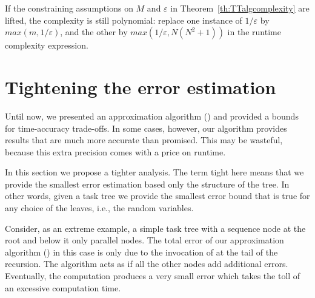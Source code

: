 \documentclass{article}
\begin{document}
If the constraining assumptions on $M$ and $\varepsilon$ in Theorem~\ref{th:TTalgcomplexity} are lifted, the complexity is still polynomial:
replace one instance of $1/\varepsilon$ by $max(m,1/\varepsilon)$, and the other by $max(1/\varepsilon,N (N^2+1))$
in the runtime complexity expression.

\section{Tightening the error estimation}\label{Chap:Bound}

Until now, we presented an approximation algorithm (\Network) and provided a bounds for time-accuracy trade-offs. In some cases, however, our algorithm provides results that are much more accurate than promised. This may be wasteful, because this extra precision comes with a price on runtime.

In this section we propose a tighter analysis. The term tight here means 
that we provide the smallest error estimation based only the structure of the tree. 
In other words, given a task tree we provide the smallest error bound that is true for any choice 
of the leaves, i.e., the random variables.


Consider, as an extreme example, a simple task tree with a sequence node at the root and below it only parallel nodes. The total error of our approximation algorithm (\Network) in this case is only due to the invocation of \Sequence at the tail of the recursion. The \Network algorithm acts as if all the other nodes add additional errors. Eventually, the \Sequence
computation produces a very small error which takes the toll of an excessive computation time. 
\end{document}
